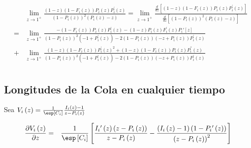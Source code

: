 \begin{eqnarray*}
&&\lim_{z\rightarrow1^{+}}\frac{\left(1-z\right)\left(1-F_{i}\left(z\right)\right)P_{i}\left(z\right)P_{i}^{'}\left(z\right)}{\left(1-P_{i}\left(z\right)\right)^{2}\left(P_{i}\left(z\right)-z\right)}=\lim_{z\rightarrow1^{+}}\frac{\frac{d}{dz}\left[\left(1-z\right)\left(1-F_{i}\left(z\right)\right)P_{i}\left(z\right)P_{i}^{'}\left(z\right)\right]}{\frac{d}{dz}\left[\left(1-P_{i}\left(z\right)\right)^{2}\left(P_{i}\left(z\right)-z\right)\right]}\\
&=&\lim_{z\rightarrow1^{+}}\frac{-\left(1-F_{i}\left(z\right)\right) P_{i}\left(z\right) P_{i}^{'}\left(z\right)-(1-z) P_{i}\left(z\right) F_{i}^{'}\left(z\right)P_i'[z]}{\left(1-P_{i}\left(z\right)\right)^2 \left(-1+P_{i}^{'}\left(z\right)\right)-2 \left(1-P_{i}\left(z\right)\right) \left(-z+P_{i}\left(z\right)\right) P_{i}^{'}\left(z\right)}\\
&+&\lim_{z\rightarrow1^{+}}\frac{(1-z) \left(1-F_{i}\left(z\right)\right) P_{i}^{'}\left(z\right)^2+(1-z) \left(1-F_{i}\left(z\right)\right) P_{i}\left(z\right) P_{i}^{''}\left(z\right)}{\left(1-P_{i}\left(z\right)\right)^2 \left(-1+P_{i}^{'}\left(z\right)\right)-2 \left(1-P_{i}\left(z\right)\right) \left(-z+P_{i}\left(z\right)\right) P_{i}^{'}\left(z\right)}\\
\end{eqnarray*}

\subsection{Longitudes de la Cola en cualquier tiempo}

Sea
$V_{i}\left(z\right)=\frac{1}{\esp\left[C_{i}\right]}\frac{I_{i}\left(z\right)-1}{z-P_{i}\left(z\right)}$


\begin{eqnarray*}
\frac{\partial V_{i}\left(z\right)}{\partial z}&=&\frac{1}{\esp\left[C_{i}\right]}\left[\frac{I_{i}{'}\left(z\right)\left(z-P_{i}\left(z\right)\right)}{z-P_{i}\left(z\right)}-\frac{\left(I_{i}\left(z\right)-1\right)\left(1-P_{i}{'}\left(z\right)\right)}{\left(z-P_{i}\left(z\right)\right)^{2}}\right]
\end{eqnarray*}


